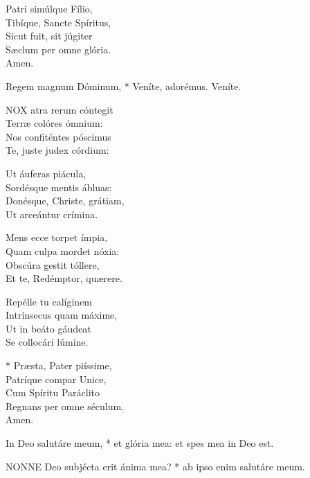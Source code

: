 Patri simúlque Fílio,\\
Tibíque, Sancte Spíritus,\\
Sicut fuit, sit júgiter\\
Sæclum per omne glória.\\
Amen.


 Regem magnum Dóminum, * Veníte, adorémus.  Veníte.


\lettrine[lines=2]{N}{OX} atra rerum cóntegit\\
Terræ colóres ómnium:\\
Nos confiténtes póscimus\\
Te, juste judex córdium:

Ut áuferas piácula,\\
Sordésque mentis ábluas:\\
Donésque, Christe, grátiam,\\
Ut arceántur crímina.

Mens ecce torpet ímpia,\\
Quam culpa mordet nóxia:\\
Obscúra gestit tóllere,\\
Et te, Redémptor, quærere.

Repélle tu calíginem\\
Intrínsecus quam máxime,\\
Ut in beáto gáudeat\\
Se collocári lúmine.

* Præsta, Pater piíssime,\\
Patríque compar Unice,\\
Cum Spíritu Paráclito\\
Regnans per omne séculum.\\
Amen.



 In Deo salutáre meum, * et glória mea: et spes mea in Deo est.


\lettrine[lines=2]{N}{ONNE} Deo subjécta erit ánima mea? * ab ipso enim salutáre meum.

